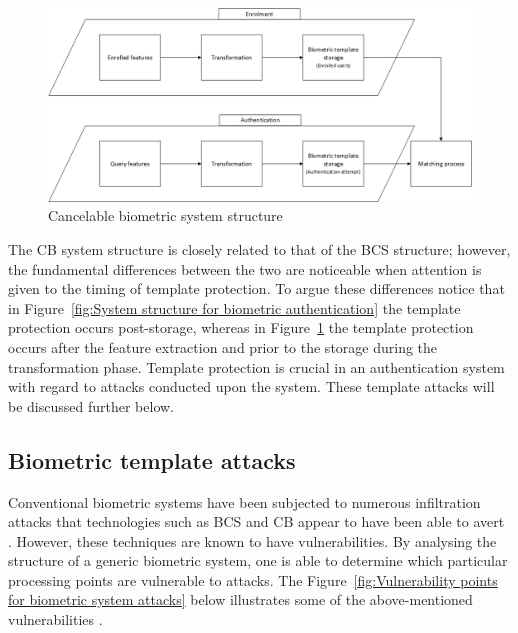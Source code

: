 \begin{figure}[htbp!] 
\centering    
\includegraphics[width=1.0\textwidth]{Chapter2/Figs/Figure2-2.png}
\caption[Cancelable biometric system structure]{Cancelable biometric system structure}
\label{fig:Cancelable biometric system structure}
\end{figure}

The CB system structure is closely related to that of the BCS structure; however, the fundamental differences between the two are noticeable when attention is given to the timing of template protection. To argue these differences notice that in Figure~\ref{fig:System structure for biometric authentication} the template protection occurs post-storage, whereas in Figure~\ref{fig:Cancelable biometric system structure} the template protection occurs after the feature extraction and prior to the storage during the transformation phase. Template protection is crucial in an authentication system with regard to attacks conducted upon the system. These template attacks will be discussed further below.

    \subsection{ Biometric template attacks}
    
    Conventional biometric systems have been subjected to numerous infiltration attacks that technologies such as BCS and CB appear to have been able to avert \citep{Rathgeb2011}. However, these techniques are known to have vulnerabilities. By analysing the structure of a generic biometric system, one is able to determine which particular processing points are vulnerable to attacks. The Figure~\ref{fig:Vulnerability points for biometric system attacks} below illustrates some of the above-mentioned vulnerabilities \citep{Patel2015}.
    
    
